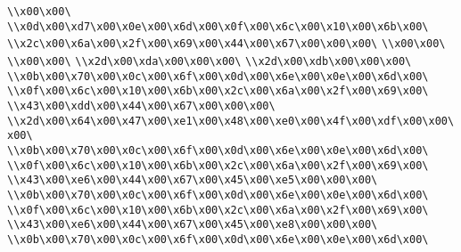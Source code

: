 \verb|\\x00\x00\|\newline
\verb|\\x0d\x00\xd7\x00\x0e\x00\x6d\x00\x0f\x00\x6c\x00\x10\x00\x6b\x00\|\newline
\verb|\\x2c\x00\x6a\x00\x2f\x00\x69\x00\x44\x00\x67\x00\x00\x00\|\newline
\verb|\\x00\x00\|\newline
\verb|\\x00\x00\|\newline
\verb|\\x2d\x00\xda\x00\x00\x00\|\newline
\verb|\\x2d\x00\xdb\x00\x00\x00\|\newline
\verb|\\x0b\x00\x70\x00\x0c\x00\x6f\x00\x0d\x00\x6e\x00\x0e\x00\x6d\x00\|\newline
\verb|\\x0f\x00\x6c\x00\x10\x00\x6b\x00\x2c\x00\x6a\x00\x2f\x00\x69\x00\|\newline
\verb|\\x43\x00\xdd\x00\x44\x00\x67\x00\x00\x00\|\newline
\verb|\\x2d\x00\x64\x00\x47\x00\xe1\x00\x48\x00\xe0\x00\x4f\x00\xdf\x00\x00\x00\|\newline
\verb|\\x0b\x00\x70\x00\x0c\x00\x6f\x00\x0d\x00\x6e\x00\x0e\x00\x6d\x00\|\newline
\verb|\\x0f\x00\x6c\x00\x10\x00\x6b\x00\x2c\x00\x6a\x00\x2f\x00\x69\x00\|\newline
\verb|\\x43\x00\xe6\x00\x44\x00\x67\x00\x45\x00\xe5\x00\x00\x00\|\newline
\verb|\\x0b\x00\x70\x00\x0c\x00\x6f\x00\x0d\x00\x6e\x00\x0e\x00\x6d\x00\|\newline
\verb|\\x0f\x00\x6c\x00\x10\x00\x6b\x00\x2c\x00\x6a\x00\x2f\x00\x69\x00\|\newline
\verb|\\x43\x00\xe6\x00\x44\x00\x67\x00\x45\x00\xe8\x00\x00\x00\|\newline
\verb|\\x0b\x00\x70\x00\x0c\x00\x6f\x00\x0d\x00\x6e\x00\x0e\x00\x6d\x00\|\newline

